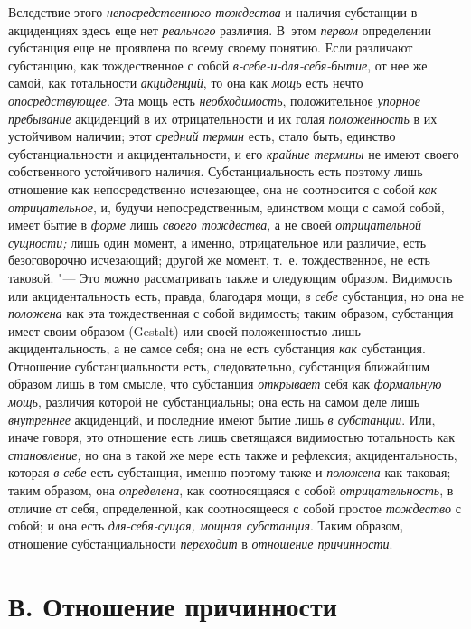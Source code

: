 Вследствие этого {\em непосредственного тождества} и
наличия субстанции в акциденциях здесь еще нет
{\em реального} различия. В~этом
{\em первом} определении субстанция еще не проявлена по
всему своему понятию. Если различают субстанцию, как тождественное с собой
{\em в-себе-и-для-себя-бытие}, от нее же самой, как
тотальности {\em акциденций}, то она как
{\em мощь} есть нечто
{\em опосредствующее}. Эта мощь есть
{\em необходимость}, положительное
{\em упорное пребывание} акциденций в их
отрицательности и их голая {\em положенность} в их
устойчивом наличии; этот {\em средний термин} есть,
стало быть, единство субстанциальности и акцидентальности, и его
{\em крайние термины} не имеют своего собственного
устойчивого наличия. Субстанциальность есть поэтому лишь отношение как
непосредственно исчезающее, она не соотносится с собой
{\em как отрицательное}, и, будучи непосредственным,
единством мощи с самой собой, имеет бытие в {\em форме}
лишь {\em своего тождества}, а не своей
{\em отрицательной сущности;} лишь один момент, а
именно, отрицательное или различие, есть безоговорочно исчезающий; другой
же момент, т.~е. тождественное, не есть таковой. "--- Это можно рассматривать
также и следующим образом. Видимость или акцидентальность есть, правда,
благодаря мощи, {\em в себе} субстанция, но она не
{\em положена} как эта тождественная с собой видимость;
таким образом, субстанция имеет своим образом (Gestalt) или своей
положенностью лишь акцидентальность, а не самое себя; она не есть
субстанция {\em как} субстанция. Отношение
субстанциальности есть, следовательно, субстанция ближайшим образом лишь в
том смысле, что субстанция {\em открывает} себя как
{\em формальную мощь}, различия которой не
субстанциальны; она есть на самом деле лишь
{\em внутреннее} акциденций, и последние имеют бытие
лишь {\em в субстанции}. Или, иначе говоря, это
отношение есть лишь светящаяся видимостью тотальность как
{\em становление;} но она в такой же мере есть также и
рефлексия; акцидентальность, которая {\em в себе} есть
субстанция, именно поэтому также и {\em положена} как
таковая; таким образом, она {\em определена}, как
соотносящаяся с собой {\em отрицательность}, в отличие
от себя, определенной, как соотносящееся с собой простое
{\em тождество} с собой; и она есть {\em для-себя-сущая, мощная
субстанция}. Таким образом, отношение субстанциальности
{\em переходит} в {\em отношение причинности}.


\section[В. Отношение причинности]{В. Отношение причинности}

